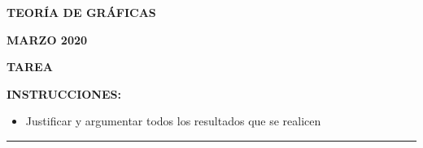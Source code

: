 \documentclass[12pts]{report}
\begin{document}
\begin{center}
\textbf{\LARGE {TEORÍA DE GRÁFICAS}}
\end{center}

\begin{center}
\textbf{\large MARZO 2020}\\
\end{center}

\begin{center}
\textbf{{\large TAREA}}
\end{center}

{\bf INSTRUCCIONES: }
\begin{itemize}
\item Justificar y argumentar todos los resultados que se realicen
\end{itemize}

\begin{center}
\rule[0mm]{20cm}{0.2mm}
\end{center}
\end{document}
